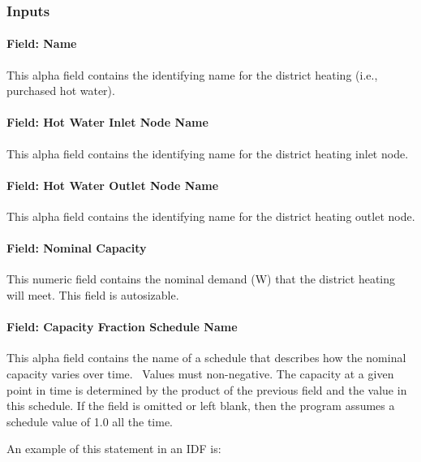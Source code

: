 \subsubsection{Inputs}\label{inputs-17-006}

\paragraph{Field: Name}\label{field-name-16-006}

This alpha field contains the identifying name for the district heating (i.e., purchased hot water).

\paragraph{Field: Hot Water Inlet Node Name}\label{field-hot-water-inlet-node-name-2}

This alpha field contains the identifying name for the district heating inlet node.

\paragraph{Field: Hot Water Outlet Node Name}\label{field-hot-water-outlet-node-name-2}

This alpha field contains the identifying name for the district heating outlet node.

\paragraph{Field: Nominal Capacity}\label{field-nominal-capacity-11}

This numeric field contains the nominal demand (W) that the district heating will meet. This field is autosizable.

\paragraph{Field: Capacity Fraction Schedule Name}\label{field-capacity-fraction-schedule-name-1}

This alpha field contains the name of a schedule that describes how the nominal capacity varies over time.~ Values must non-negative. The capacity at a given point in time is determined by the product of the previous field and the value in this schedule. If the field is omitted or left blank, then the program assumes a schedule value of 1.0 all the time.

An example of this statement in an IDF is:

